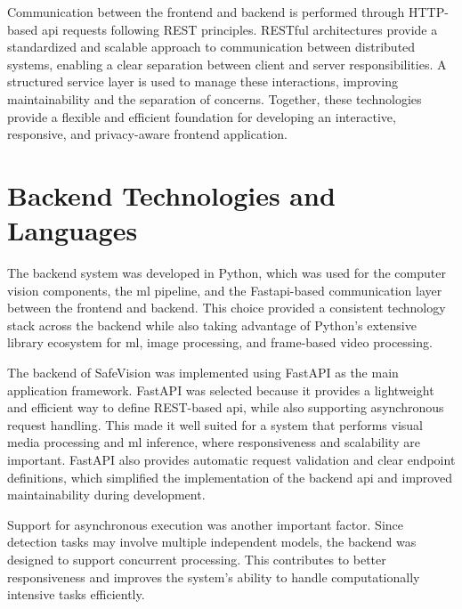 
Communication between the frontend and backend is performed through HTTP-based \acrshort{api} requests following REST principles. RESTful architectures \cite{rest_fielding} provide a standardized and scalable approach to communication between distributed systems, enabling a clear separation between client and server responsibilities. A structured service layer is used to manage these interactions, improving maintainability and the separation of concerns. Together, these technologies provide a flexible and efficient foundation for developing an interactive, responsive, and privacy-aware frontend application.


\section{Backend Technologies and Languages}

The backend system was developed in Python, which was used for the computer vision components, the \acrshort{ml} pipeline, and the Fast\acrshort{api}-based communication layer between the frontend and backend. This choice provided a consistent technology stack across the backend while also taking advantage of Python’s extensive library ecosystem for \acrshort{ml}, image processing,
and frame-based video processing.



The backend of \gls{SafeVision} was implemented using FastAPI as the main application framework. FastAPI was selected because it provides a lightweight and efficient way to define REST-based \acrshort{api}, while also supporting asynchronous request handling. This made it well suited for a system that performs visual media processing and \acrshort{ml} \gls{inference}, where responsiveness and scalability are important. FastAPI also provides automatic request validation and clear endpoint definitions, which simplified the implementation of the backend \acrshort{api} and improved maintainability during development.

Support for asynchronous execution was another important factor. Since detection tasks may involve multiple independent models, the backend was designed to support concurrent processing. This contributes to better responsiveness and improves the system’s ability to handle computationally intensive tasks efficiently.


